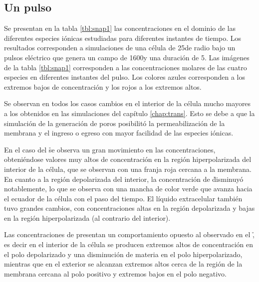 \subsection*{Un pulso}

\newcommand{\lineasnap}[7]{
	#2 &
	\texttt{[image: \#1\#3.png]} & 
	\texttt{[image: \#1\#4.png]} & 
	\texttt{[image: \#1\#5.png]} & 
	\texttt{[image: \#1\#6.png]} & 
	\texttt{[image: \#1\#7.png]} \\
}

Se presentan en la tabla \ref{tbl:snap1} las concentraciones en el dominio de las diferentes especies iónicas estudiadas para diferentes instantes de tiempo. Los resultados corresponden a simulaciones de una célula de 25\usec de radio bajo un pulsos eléctrico que genera un campo de 1600\vcm y una duración de 5\ms. Las imágenes de la tabla \ref{tbl:snap1} corresponden a las concentraciones molares de las cuatro especies en diferentes instantes del pulso. Los colores azules corresponden a los extremos bajos de concentración y los rojos a los extremos altos.

Se observan en todos los casos cambios en el interior de la célula mucho mayores a los obtenidos en las simulaciones del capítulo \ref{chap:trans}. Esto se debe a que la simulación de la generación de poros posibilitó la permeabilización de la membrana y el ingreso o egreso con mayor facilidad de las especies iónicas. 

En el caso del \h se observa un gran movimiento en las concentraciones, obteniéndose valores muy altos de concentración en la región hiperpolarizada del interior de la célula, que se observan con una franja roja cercana a la membrana. En cuanto a la región depolarizada del interior, la concentración de \h disminuyó notablemente, lo que se observa con una mancha de color verde que avanza hacia el ecuador de la célula con el paso del tiempo. El líquido extracelular también tuvo grandes cambios, con concentraciones altas en la región depolarizada y bajas en la región hiperpolarizada (al contrario del interior).

Las concentraciones de \oh presentan un comportamiento opuesto al observado en el \h, es decir en el interior de la célula se producen extremos altos de concentración en el polo depolarizado y una disminución de materia en el polo hiperpolarizado, mientras que en el exterior se alcanzan extremos altos cerca de la región de la membrana cercana al polo positivo y extremos bajos en el polo negativo. 

